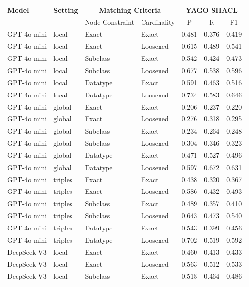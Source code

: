 \begin{table}[h]
\centering
\begin{tabular}{ll|ll|ccc}
\hline
\textbf{Model} & \textbf{Setting} & \multicolumn{2}{c|}{\textbf{Matching Criteria}} & \multicolumn{3}{c}{\textbf{YAGO SHACL}} \\
& & Node Constraint & Cardinality & P & R & F1 \\
\hline
GPT-4o mini & local & Exact & Exact & 0.481 & 0.376 & 0.419 \\
GPT-4o mini & local & Exact & Loosened & 0.615 & 0.489 & 0.541 \\
GPT-4o mini & local & Subclass & Exact & 0.542 & 0.424 & 0.473 \\
GPT-4o mini & local & Subclass & Loosened & 0.677 & 0.538 & 0.596 \\
GPT-4o mini & local & Datatype & Exact & 0.591 & 0.463 & 0.516 \\
GPT-4o mini & local & Datatype & Loosened & 0.734 & 0.583 & 0.646 \\
GPT-4o mini & global & Exact & Exact & 0.206 & 0.237 & 0.220 \\
GPT-4o mini & global & Exact & Loosened & 0.276 & 0.318 & 0.295 \\
GPT-4o mini & global & Subclass & Exact & 0.234 & 0.264 & 0.248 \\
GPT-4o mini & global & Subclass & Loosened & 0.304 & 0.346 & 0.323 \\
GPT-4o mini & global & Datatype & Exact & 0.471 & 0.527 & 0.496 \\
GPT-4o mini & global & Datatype & Loosened & 0.597 & 0.672 & 0.631 \\
GPT-4o mini & triples & Exact & Exact & 0.438 & 0.320 & 0.367 \\
GPT-4o mini & triples & Exact & Loosened & 0.586 & 0.432 & 0.493 \\
GPT-4o mini & triples & Subclass & Exact & 0.489 & 0.357 & 0.410 \\
GPT-4o mini & triples & Subclass & Loosened & 0.643 & 0.473 & 0.540 \\
GPT-4o mini & triples & Datatype & Exact & 0.543 & 0.399 & 0.456 \\
GPT-4o mini & triples & Datatype & Loosened & 0.702 & 0.519 & 0.592 \\
\hline
DeepSeek-V3 & local & Exact & Exact & 0.460 & 0.413 & 0.433 \\
DeepSeek-V3 & local & Exact & Loosened & 0.563 & 0.512 & 0.533 \\
DeepSeek-V3 & local & Subclass & Exact & 0.518 & 0.464 & 0.486 \\

\end{tabular}
\end{table}
